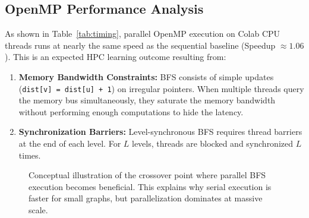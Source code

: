 \documentclass[12pt, a4paper]{article}
\begin{document}
\subsection{OpenMP Performance Analysis}
As shown in Table~\ref{tab:timing}, parallel OpenMP execution on Colab CPU threads runs at nearly the same speed as the sequential baseline (Speedup $\approx 1.06$). This is an expected HPC learning outcome resulting from:
\begin{enumerate}
    \item \textbf{Memory Bandwidth Constraints:} BFS consists of simple updates (\texttt{dist[v] = dist[u] + 1}) on irregular pointers. When multiple threads query the memory bus simultaneously, they saturate the memory bandwidth without performing enough computations to hide the latency.
    \item \textbf{Synchronization Barriers:} Level-synchronous BFS requires thread barriers at the end of each level. For $L$ levels, threads are blocked and synchronized $L$ times.
\end{enumerate}

\begin{figure}[H]
\centering
{}
\caption{Conceptual illustration of the crossover point where parallel BFS execution becomes beneficial. This explains why serial execution is faster for small graphs, but parallelization dominates at massive scale.}
\end{figure}
\end{document}
